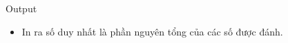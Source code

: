 Output
\begin{itemize}
	\item     In ra số duy nhất là phần nguyên tổng của các số được đánh.   
\end{itemize}